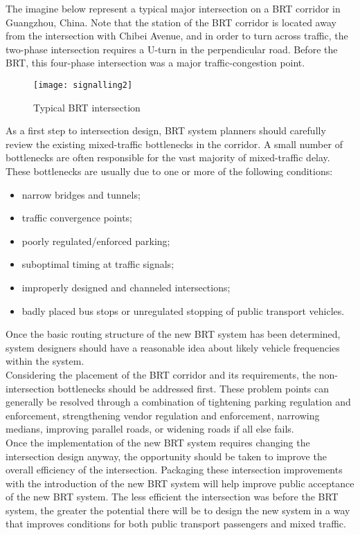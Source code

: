 \documentclass{article}
\begin{document}
The imagine below represent a typical major intersection on a BRT corridor in Guangzhou, China. Note that the station of the BRT corridor is located away from the intersection with Chibei Avenue, and in order to turn across traffic, the two-phase intersection requires a U-turn in the perpendicular road. Before the BRT, this four-phase intersection was a major traffic-congestion point. 
\begin{figure}[H]
\centering
\texttt{[image: signalling2]}
\caption{Typical BRT intersection}
\end{figure}
As a first step to intersection design, BRT system planners should carefully review the existing mixed-traffic bottlenecks in the corridor. A small number of bottlenecks are often responsible for the vast majority of mixed-traffic delay. These bottlenecks are usually due to one or more of the following conditions: 
\begin{itemize}
\item narrow bridges and tunnels; 
\item traffic convergence points; 
\item poorly regulated/enforced parking; 
\item suboptimal timing at traffic signals; 
\item improperly designed and channeled intersections; 
\item badly placed bus stops or unregulated stopping of public transport vehicles. 
\end{itemize}
Once the basic routing structure of the new BRT system has been determined, system designers should have a reasonable idea about likely vehicle frequencies within the system.\\
Considering the placement of the BRT corridor and its requirements, the non-intersection bottlenecks should be addressed first. These problem points can generally be resolved through a combination of tightening parking regulation and enforcement, strengthening vendor regulation and enforcement, narrowing medians, improving parallel roads, or widening roads if all else fails.\\
Once the implementation of the new BRT system requires changing the intersection design anyway, the opportunity should be taken to improve the overall efficiency of the intersection. Packaging these intersection improvements with the introduction of the new BRT system will help improve public acceptance of the new BRT system. The less efficient the intersection was before the BRT system, the greater the potential there will be to design the new system in a way that improves conditions for both public transport passengers and mixed traffic. 
\end{document}
